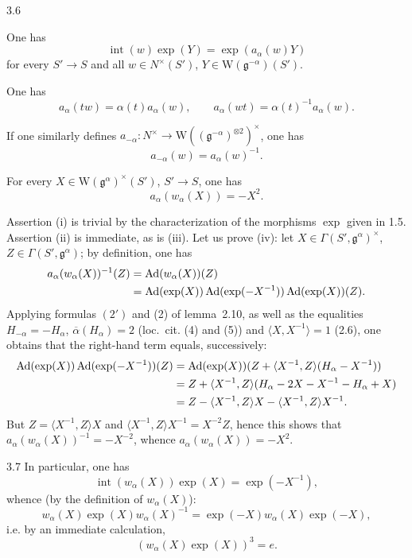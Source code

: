 \begin{theorem}{3.6}\label{XX.3.6}
\begin{enumeratei}
\item One has
\[
\operatorname{int}(w)\exp(Y)=\exp(a_\alpha(w)Y)
\]
for every $S'\to S$ and all $w\in N^\times(S')$, $Y\in\mathrm W(\mathfrak g^{-\alpha})(S')$.
\item One has
\[
a_\alpha(tw)=\alpha(t)a_\alpha(w),\qquad a_\alpha(wt)=\alpha(t)^{-1}a_\alpha(w).
\]
\item If one similarly defines $a_{-\alpha}:N^\times\to\mathrm W((\mathfrak g^{-\alpha})^{\otimes2})^\times$, one has
\[
a_{-\alpha}(w)=a_\alpha(w)^{-1}.
\]
{\renewcommand{\thefootnote}{(28)}}
\item For every $X\in\mathrm W(\mathfrak g^\alpha)^\times(S')$, $S'\to S$, one has
\[
a_\alpha(w_\alpha(X))=-X^2.
\]
\end{enumeratei}
\end{theorem}
Assertion (i) is trivial by the characterization of the morphisms $\exp$ given in 1.5. Assertion (ii) is immediate, as is (iii). Let us prove (iv): let $X\in\Gamma(S',\mathfrak g^\alpha)^\times$, $Z\in\Gamma(S',\mathfrak g^\alpha)$; by definition, one has{\renewcommand{\thefootnote}{(29)}}
\[
\begin{split}
a_\alpha(w_\alpha(X))^{-1}(Z)&=\operatorname{Ad}(w_\alpha(X))(Z)\\
&=\operatorname{Ad}(\exp(X))\operatorname{Ad}(\exp(-X^{-1}))\operatorname{Ad}(\exp(X))(Z).
\end{split}
\]
Applying formulas $(2')$ and (2) of lemma~2.10, as well as the equalities $H_{-\alpha}=-H_\alpha$, $\overline\alpha(H_\alpha)=2$ (loc.~cit. (4) and (5)) and $\langle X,X^{-1}\rangle=1$ (2.6), one obtains that the right-hand term equals, successively:
\[
\begin{aligned}
\operatorname{Ad}(\exp(X))\operatorname{Ad}(\exp(-X^{-1}))(Z)
&=\operatorname{Ad}(\exp(X))(Z+\langle X^{-1},Z\rangle(H_\alpha-X^{-1}))\\
&=Z+\langle X^{-1},Z\rangle(H_\alpha-2X-X^{-1}-H_\alpha+X)\\
&=Z-\langle X^{-1},Z\rangle X-\langle X^{-1},Z\rangle X^{-1}.
\end{aligned}
\]
But $Z=\langle X^{-1},Z\rangle X$ and $\langle X^{-1},Z\rangle X^{-1}=X^{-2}Z$, hence this shows that $a_\alpha(w_\alpha(X))^{-1}=-X^{-2}$, whence $a_\alpha(w_\alpha(X))=-X^2$.

\begin{corollary}{3.7}\label{XX.3.7}
In particular, one has
\[
\operatorname{int}(w_\alpha(X))\exp(X)=\exp(-X^{-1}),
\]
whence (by the definition of $w_\alpha(X)$):
\[
w_\alpha(X)\exp(X)w_\alpha(X)^{-1}=\exp(-X)w_\alpha(X)\exp(-X),
\]
i.e. by an immediate calculation,
\[
(w_\alpha(X)\exp(X))^3=e.
\]
\end{corollary}

